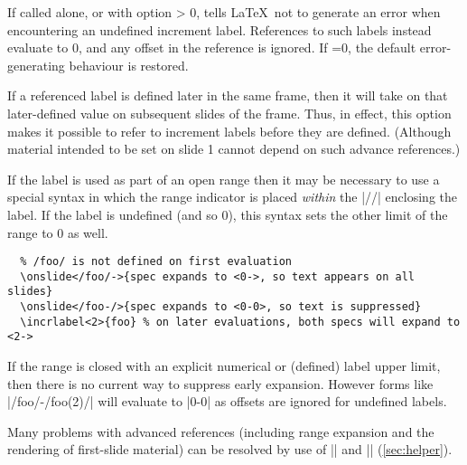 \documentclass[a4paper]{ltxdoc}
\begin{document}
\begin{command}{\allowundefinedincrlabels{}}
  If called alone, or with option  > 0, tells \LaTeX\ not to
  generate an error when encountering an undefined increment label.  References
  to such labels instead evaluate to 0, and any offset in the reference is
  ignored.  If =0, the default error-generating behaviour is
  restored.
\end{command}
If a referenced label is defined later in the same frame, then it will take on
that later-defined value on subsequent slides of the frame.  Thus, in effect,
this option makes it possible to refer to increment labels before they are
defined.  (Although material intended to be set on slide 1 cannot depend on such
advance references.)

If the label is used as part of an open range then it may be necessary to use a
special syntax in which the range indicator is placed \emph{within} the |//|
enclosing the label.  If the label is undefined (and so 0), this syntax sets the
other limit of the range to 0 as well.
\example
\begin{verbatim}
  % /foo/ is not defined on first evaluation
  \onslide</foo/->{spec expands to <0->, so text appears on all slides}
  \onslide</foo-/>{spec expands to <0-0>, so text is suppressed}
  \incrlabel<2>{foo} % on later evaluations, both specs will expand to <2->
\end{verbatim}
If the range is closed with an explicit numerical or (defined) label upper
limit, then there is no current way to suppress early expansion.  However forms
like |/foo/-/foo(2)/| will evaluate to |0-0| as offsets are ignored for
undefined labels.

Many problems with advanced references (including range expansion and the
rendering of first-slide material) can be resolved by use of |\framescanonly|
and |\againframe| (\cref{sec:helper}).
\end{document}
